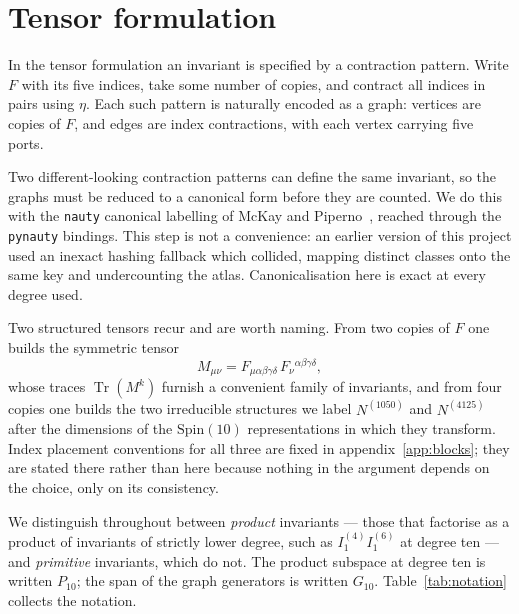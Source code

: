 \documentclass[11pt,a4paper]{article}
\theoremstyle{definition}
\theoremstyle{remark}
\newcommand{\Pten}{P_{10}}
\newcommand{\Gten}{G_{10}}
\begin{document}
\section{Tensor formulation}
\label{sec:tensor}

In the tensor formulation an invariant is specified by a contraction pattern.
Write $F$ with its five indices, take some number of copies, and contract all
indices in pairs using $\eta$. Each such pattern is naturally encoded as a graph:
vertices are copies of $F$, and edges are index contractions, with each vertex
carrying five ports.

Two different-looking contraction patterns can define the same invariant, so the
graphs must be reduced to a canonical form before they are counted. We do this
with the \texttt{nauty} canonical labelling of McKay and
Piperno~\cite{McKay:2013}, reached through the \texttt{pynauty} bindings. This
step is not a convenience: an earlier version of this project used an inexact
hashing fallback which collided, mapping distinct classes onto the same key and
undercounting the atlas. Canonicalisation here is exact at every degree used.

Two structured tensors recur and are worth naming. From two copies of $F$ one
builds the symmetric tensor
\begin{equation}
M_{\mu\nu} = F_{\mu\alpha\beta\gamma\delta}\,
             F_\nu{}^{\alpha\beta\gamma\delta},
\end{equation}
whose traces $\operatorname{Tr}(M^k)$ furnish a convenient family of invariants,
and from four copies one builds the two irreducible structures we label
$N^{(1050)}$ and $N^{(4125)}$ after the dimensions of the $\mathrm{Spin}(10)$
representations in which they transform. Index placement conventions for all
three are fixed in appendix~\ref{app:blocks}; they are stated there rather than
here because nothing in the argument depends on the choice, only on its
consistency.

We distinguish throughout between \emph{product} invariants --- those that
factorise as a product of invariants of strictly lower degree, such as
$I^{(4)}_1 I^{(6)}_1$ at degree ten --- and \emph{primitive} invariants, which do
not. The product subspace at degree ten is written $\Pten$; the span of the
graph generators is written $\Gten$. Table~\ref{tab:notation} collects the
notation.


\end{document}
